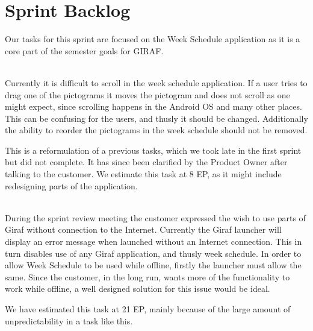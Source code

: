 \section{Sprint Backlog}\label{plan2}
Our tasks for this sprint are focused on the Week Schedule application as it is a core part of the semester goals for GIRAF.
\begin{description}[style=unboxed]
    \item[{[}\phigh{]} Week Schedule -- Long Schedules] \hfill \\ 
    Currently it is difficult to scroll in the week schedule application.
    If a user tries to drag one of the pictograms it moves the pictogram and does not scroll as one might expect, since scrolling happens in the Android OS and many other places. 
    This can be confusing for the users, and thusly it should be changed. 
    Additionally the ability to reorder the pictograms in the week schedule should not be removed. 

    This is a reformulation of a previous tasks, which we took late in the first sprint but did not complete. 
    It has since been clarified by the Product Owner after talking to the customer. 
    We estimate this task at 8 EP, as it might include redesigning parts of the application. 
    \item[{[}\phigh{]} Week Schedule -- Offline Usage] \hfill \\ 
    During the sprint review meeting the customer expressed the wish to use parts of Giraf without connection to the Internet. 
    Currently the Giraf launcher will display an error message when launched without an Internet connection. 
    This in turn disables use of any Giraf application, and thusly week schedule. 
    In order to allow Week Schedule to be used while offline, firstly the launcher must allow the same. 
    Since the customer, in the long run, wants more of the functionality to work while offline, a well designed solution for this issue would be ideal. 

    We have estimated this task at 21 EP, mainly because of the large amount of unpredictability in a task like this. 


\end{description}
